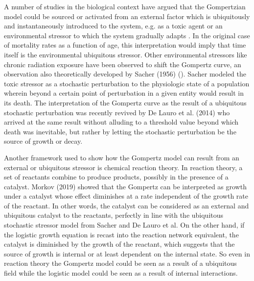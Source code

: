 \documentclass{article}
\begin{document}
A number of studies in the biological context have argued that the Gompertzian model could be sourced or activated from an external factor which is ubiquitously and instantaneously introduced to the system, e.g. as a toxic agent or an environmental stressor to which the system gradually adapts \cite{neafsey1988gompertz,neafsey1989gompertz,thompson1990biphasic}. In the original case of mortality rates as a function of age, this interpretation would imply that time itself is the environmental ubiquitous stressor. Other environmental stressors like chronic radiation exposure have been observed to shift the Gompertz curve, an observation also theoretically developed by Sacher (1956) (\cite{sacher1956statistical}). Sacher modeled the toxic stressor as a stochastic perturbation to the physiologic state of a population wherein beyond a certain point of perturbation in a given entity would result in its death. The interpretation of the Gompertz curve as the result of a ubiquitous stochastic perturbation was recently revived by De Lauro et al. (2014) \cite{de2014stochastic} who arrived at the same result without alluding to a threshold value beyond which death was inevitable, but rather by letting the stochastic perturbation be the source of growth or decay.

Another framework used to show how the Gompertz model can result from an external or ubiquitous stressor is chemical reaction theory. In reaction theory, a set of reactants combine to produce products, possibly in the presence of a catalyst. Morkov (2019) \cite{markov2019reaction} showed that the Gompertz can be interpreted as growth under a catalyst whose effect diminishes at a rate independent of the growth rate of the reactant. In other words, the catalyst can be considered as an external and ubiquitous catalyst to the reactants, perfectly in line with the ubiquitous stochastic stressor model from Sacher and De Lauro et al. On the other hand, if the logistic growth equation is recast into the reaction network equivalent, the catalyst is diminished by the growth of the reactant, which suggests that the source of growth is internal or at least dependent on the internal state. So even in reaction theory the Gompertz model could be seen as a result of a ubiquitous field while the logistic model could be seen as a result of internal interactions. 
\end{document}
